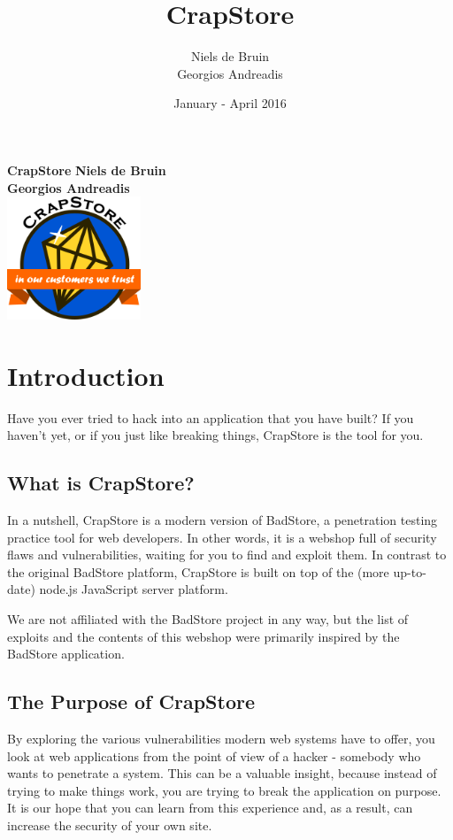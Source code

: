 \documentclass[12pt,a4paper]{article}
\title{CrapStore}
\author{Niels de Bruin\\
	Georgios Andreadis}
\date{January - April 2016}
\begin{document}
\begin{titlepage}
	\centering
	\vfill
	{\bfseries\LARGE
		CrapStore
	}
	\vskip2cm
	{\bfseries
		Niels de Bruin\\
		Georgios Andreadis\\
	} 
	\vfill
	\includegraphics[width=4cm]{../client/images/logo_large.png}
	\vfill
	\vfill
\end{titlepage}
\pagebreak

\tableofcontents
\pagebreak

\section{Introduction}
Have you ever tried to hack into an application that you have built? If you haven't yet, or if you just like breaking things, CrapStore is the tool for you.

\subsection{What is CrapStore?}
In a nutshell, CrapStore is a modern version of BadStore, a penetration testing practice tool for web developers. In other words, it is a webshop full of security flaws and vulnerabilities, waiting for you to find and exploit them. In contrast to the original BadStore platform, CrapStore is built on top of the (more up-to-date) node.js JavaScript server platform.

We are not affiliated with the BadStore project in any way, but the list of exploits and the contents of this webshop were primarily inspired by the BadStore application.

\subsection{The Purpose of CrapStore}
By exploring the various vulnerabilities modern web systems have to offer, you look at web applications from the point of view of a hacker - somebody who wants to penetrate a system. This can be a valuable insight, because instead of trying to make things work, you are trying to break the application on purpose. It is our hope that you can learn from this experience and, as a result, can increase the security of your own site.
\end{document}
